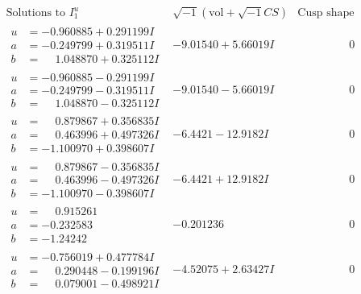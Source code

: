 \documentclass[1p]{elsarticle_modified}
\theoremstyle{definition}
\newcommand{\I}{\sqrt{-1}}
\begin{document}
$$\begin{array}{c|c|c}  
\text{Solutions to }I^u_{1}& \I (\text{vol} + \sqrt{-1}CS) & \text{Cusp shape}\\
 \hline 
\begin{aligned}
u &= -0.960885 + 0.291199 I \\
a &= -0.249799 + 0.319511 I \\
b &= \phantom{-}1.048870 + 0.325112 I\end{aligned}
 & -9.01540 + 5.66019 I & \phantom{-0.000000 } 0 \\ \hline\begin{aligned}
u &= -0.960885 - 0.291199 I \\
a &= -0.249799 - 0.319511 I \\
b &= \phantom{-}1.048870 - 0.325112 I\end{aligned}
 & -9.01540 - 5.66019 I & \phantom{-0.000000 } 0 \\ \hline\begin{aligned}
u &= \phantom{-}0.879867 + 0.356835 I \\
a &= \phantom{-}0.463996 + 0.497326 I \\
b &= -1.100970 + 0.398607 I\end{aligned}
 & -6.4421 - 12.9182 I & \phantom{-0.000000 } 0 \\ \hline\begin{aligned}
u &= \phantom{-}0.879867 - 0.356835 I \\
a &= \phantom{-}0.463996 - 0.497326 I \\
b &= -1.100970 - 0.398607 I\end{aligned}
 & -6.4421 + 12.9182 I & \phantom{-0.000000 } 0 \\ \hline\begin{aligned}
u &= \phantom{-}0.915261\phantom{ +0.000000I} \\
a &= -0.232583\phantom{ +0.000000I} \\
b &= -1.24242\phantom{ +0.000000I}\end{aligned}
 & -0.201236\phantom{ +0.000000I} & \phantom{-0.000000 } 0 \\ \hline\begin{aligned}
u &= -0.756019 + 0.477784 I \\
a &= \phantom{-}0.290448 - 0.199196 I \\
b &= \phantom{-}0.079001 - 0.498921 I\end{aligned}
 & -4.52075 + 2.63427 I & \phantom{-0.000000 } 0 \\ \hline\begin{aligned}

\end{aligned}
\end{array}$$
\end{document}
